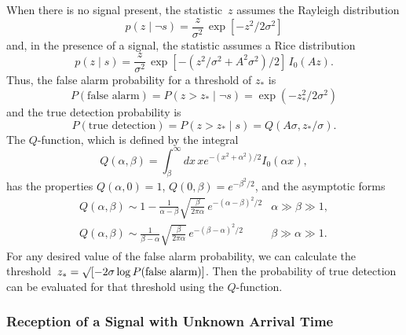 When there is no signal present, the statistic~$z$ assumes the Rayleigh
distribution
\begin{equation}
  p(z\mid\neg s) = \frac{z}{\sigma^2}\,\exp[-z^2/2\sigma^2]
\end{equation}
and, in the presence of a signal, the statistic assumes a Rice distribution
\begin{equation}
  p(z\mid s) =
    \frac{z}{\sigma^2}\,\exp[-(z^2/\sigma^2+A^2\sigma^2)/2]\,I_0(Az).
\end{equation}
Thus, the false alarm probability for a threshold of $z_\ast$ is
\begin{equation}
  P(\mbox{false alarm}) = P(z>z_\ast\mid\neg s) = \exp(-z^2_\ast/2\sigma^2)
\end{equation}
and the true detection probability is
\begin{equation}
  P(\mbox{true detection}) = P(z>z_\ast\mid s) = Q(A\sigma,z_\ast/\sigma).
\end{equation}
The $Q$-function, which is defined by the integral
\begin{equation}
  Q(\alpha,\beta) = \int_\beta^\infty dx\,
    x e^{-(x^2+\alpha^2)/2}I_0(\alpha x),
\end{equation}
has the properties $Q(\alpha,0)=1$, $Q(0,\beta)=e^{-\beta^2/2}$, and the
asymptotic forms
\begin{equation}
  \begin{array}{ll}
    Q(\alpha,\beta) \sim 1 - \frac{1}{\alpha-\beta}
      \sqrt{\frac{\beta}{2\pi\alpha}}\,e^{-(\alpha-\beta)^2/2} &
    \alpha\gg\beta\gg1, \\[12pt]
    Q(\alpha,\beta) \sim \frac{1}{\beta-\alpha}
      \sqrt{\frac{\beta}{2\pi\alpha}}\,e^{-(\beta-\alpha)^2/2} &
    \beta\gg\alpha\gg1.
  \end{array}
\end{equation}
For any desired value of the false alarm probability, we can calculate
the threshold~$z_\ast=\surd[-2\sigma\log P(\mbox{false alarm})]$.  Then
the probability of true detection can be evaluated for that threshold
using the $Q$-function.

\subsubsection{Reception of a Signal with Unknown Arrival Time}

